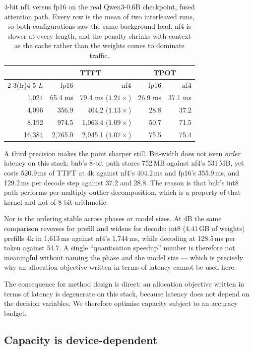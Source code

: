 \documentclass[5p]{elsarticle}
\begin{document}
\begin{table}[t]
\centering
\caption{4-bit nf4 versus fp16 on the real Qwen3-0.6B checkpoint, fused
attention path. Every row is the mean of two interleaved runs, so both
configurations saw the same background load. nf4 is slower at every length, and
the penalty shrinks with context as the cache rather than the weights comes to
dominate traffic.}
\label{tab:nospeed}
\begin{tabular}{rrrrr}
\toprule
& \multicolumn{2}{c}{TTFT} & \multicolumn{2}{c}{TPOT} \\
\cmidrule(lr){2-3}\cmidrule(lr){4-5}
$L$ & fp16 & nf4 & fp16 & nf4 \\
\midrule
1{,}024 & 65.4 ms & 79.4 ms ($1.21\times$) & 26.9 ms & 37.1 ms \\
4{,}096 & 356.9 & 404.2 ($1.13\times$) & 28.8 & 37.2 \\
8{,}192 & 974.5 & 1{,}063.4 ($1.09\times$) & 50.7 & 71.5 \\
16{,}384 & 2{,}765.0 & 2{,}945.1 ($1.07\times$) & 75.5 & 75.4 \\
\bottomrule
\end{tabular}
\end{table}

A third precision makes the point sharper still. Bit-width does not even
\emph{order} latency on this stack: bnb's 8-bit path stores 752\,MB against
nf4's 531\,MB, yet costs 520.9\,ms of TTFT at 4k against nf4's 404.2\,ms and
fp16's 355.9\,ms, and 129.2\,ms per decode step against 37.2 and 28.8. The
reason is that bnb's int8 path performs per-multiply outlier decomposition,
which is a property of that kernel and not of 8-bit arithmetic.

Nor is the ordering stable across phases or model sizes. At 4B the same
comparison reverses for prefill and widens for decode: int8 (4.41\,GB of
weights) prefills 4k in 1{,}613\,ms against nf4's 1{,}744\,ms, while decoding at
128.5\,ms per token against 54.7. A single ``quantisation speedup'' number is
therefore not meaningful without naming the phase and the model size --- which is
precisely why an allocation objective written in terms of latency cannot be used
here.

The consequence for method design is direct: an allocation objective written in
terms of latency is degenerate on this stack, because latency does not depend on
the decision variables. We therefore optimise capacity subject to an accuracy
budget.

\subsection{Capacity is device-dependent}
\label{sec:results-capacity}
\end{document}
